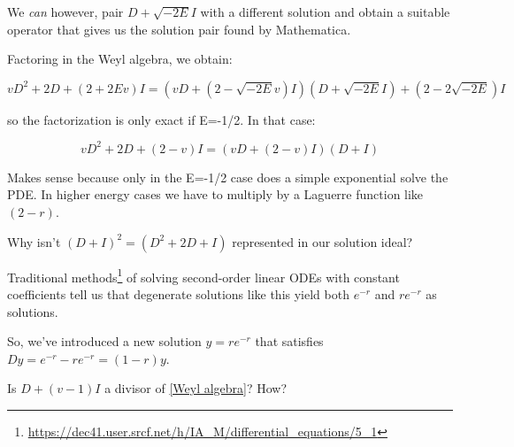 \documentclass{article}
\begin{document}
We {\it can} however, pair $D+\sqrt{-2E}I$ with a different solution and obtain a suitable operator
that gives us the solution pair found by Mathematica.

Factoring in the Weyl algebra, we obtain:

\begin{equation}
vD^2 + 2D + (2+2Ev) I = (vD + (2-\sqrt{-2E}v)I) (D+\sqrt{-2E}I) + (2-2\sqrt{-2E})I
\end{equation}

so the factorization is only exact if E=-1/2.  In that case:

\begin{equation}
\label{Weyl algebra}
vD^2 + 2D + (2-v) I = (vD + (2-v)I) (D+I)
\end{equation}

Makes sense because only in the E=-1/2 case does a simple exponential solve the PDE.  In
higher energy cases we have to multiply by a Laguerre function like $(2-r)$.

Why isn't $(D+I)^2 = (D^2+2D+I)$ represented in our solution ideal?

Traditional methods\footnote{\url{https://dec41.user.srcf.net/h/IA_M/differential_equations/5_1}}
of solving second-order linear ODEs with constant coefficients tell us that degenerate
solutions like this yield both $e^{-r}$ and $re^{-r}$ as solutions.

So, we've introduced a new solution $y=re^{-r}$ that satisfies $Dy=e^{-r}-re^{-r}=(1-r)y$.

Is $D+(v-1)I$ a divisor of \eqref{Weyl algebra}?  How?
\end{document}
